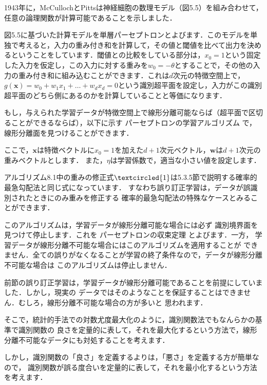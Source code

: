 1943年に，McCullochとPittsは神経細胞の数理モデル（図5.5）を組み合わせて，任意の論理関数が計算可能であることを示しました．

図5.5に基づいた計算モデルを単層パーセプトロンとよびます．このモデルを単独で考えると，入力の重み付き和を計算して，その値と閾値を比べて出力を決めるということをしています．閾値との比較をしている部分は，$x_0 = 1$という固定した入力を仮定し，この入力に対する重みを$w_0 = - \theta$とすることで，その他の入力の重み付き和に組み込むことができます．これは$d$次元の特徴空間上で，$g(\bm{x}) = w_0+w_1 x_1+\dots+w_d x_d = 0$という識別超平面を設定し，入力がこの識別超平面のどちら側にあるのかを計算していることと等価になります．

もし，与えられた学習データが特徴空間上で線形分離可能ならば（超平面で区切ることができるならば），以下に示す
パーセプトロンの学習アルゴリズム
で，線形分離面を見つけることができます．


ここで，$\bm{x}$は特徴ベクトルに$x_0=1$を加えた$d+1$次元ベクトル，$\bm{w}$は$d+1$次元の重みベクトルとします．
また，$\eta$は学習係数で，適当な小さい値を設定します．


アルゴリズム8.1中の重みの修正式$ \textcircled{1}$は5.3.5節で説明する確率的最急勾配法と同じ式になっています．
すなわち誤り訂正学習は，データが誤識別されたときにのみ重みを修正する
確率的最急勾配法の特殊なケースとみることができます．


このアルゴリズムは，学習データが線形分離可能な場合には必ず
識別境界面を見つけて停止します．これを
パーセプトロンの収束定理
とよびます．一方，
学習データが線形分離不可能な場合にはこのアルゴリズムを適用することが
できません．全ての誤りがなくなることが学習の終了条件なので，データが線形分離不可能な場合は
このアルゴリズムは停止しません．


前節の誤り訂正学習は，学習データが線形分離可能であることを前提にしていました．しかし，現実の
データではそのようなことを保証することはできません．むしろ，線形分離不可能な場合の方が多いと
思われます．

そこで，統計的手法での対数尤度最大化のように，識別関数法でもなんらかの基準で識別関数の
良さを定量的に表して，それを最大化するという方法で，線形分離不可能なデータにも対処することを考えます．

しかし，識別関数の「良さ」を定義するよりは，「悪さ」を定義する方が簡単なので，
識別関数が誤る度合いを定量的に表して，それを最小化するという方法を考えます．

